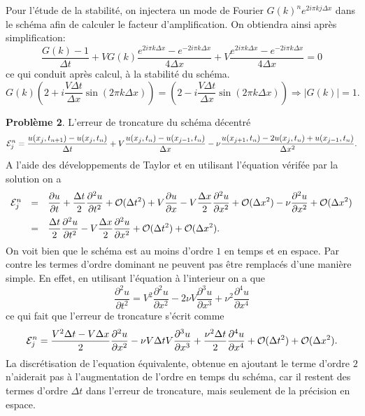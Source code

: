 \documentclass[12pt,a4paper]{article}
\begin{document}
\begin{enumerate}
\noindent Pour l'\'etude de la stabilit\'e, on injectera un mode de
Fourier $G(k)^ne^{2i\pi kj\Delta x}$ dans le sch\'ema afin de calculer le facteur
d'amplification. On obtiendra ainsi apr\`es simplification:
$$
\frac{G(k)-1}{\Delta t}+VG(k)\frac{e^{2i\pi k\Delta x} -e^{-2i\pi k\Delta x} }{4\Delta x}+V\frac{e^{2i\pi k\Delta x} -e^{-2i\pi k\Delta x} }{4\Delta x}=0
$$
ce qui conduit apr\`es calcul, \`a la stabilit\'e du sch\'ema.
$$
G(k) \left(2 + i\frac{V\Delta t}{\Delta x}\sin(2\pi k\Delta x)\right)=
\left(2 - i\frac{V\Delta t}{\Delta x}\sin(2\pi k\Delta
  x)\right)\Rightarrow |G(k)|=1.
$$
\end{enumerate}
{\bf Probl\`eme 2}. L'erreur de troncature du sch\'ema d\'ecentr\'e
$$
{\cal E}^n_j=\frac{u(x_{j},t_{n+1})-u(x_j,t_n)}{\Delta
  t}+V\frac{u(x_{j},t_{n})-u(x_{j-1},t_n)}{\Delta
  x}-\nu\frac{u(x_{j+1},t_n)-2
  u(x_{j},t_n)+u(x_{j-1},t_n)}{\Delta x^2}.
$$
A l'aide des d\'eveloppements de Taylor et en utilisant l'\'equation
v\'erif\'ee par la solution on a
$$
\begin{array}{lcl}
{\cal E}^n_j &=& \displaystyle\frac{\partial u}{\partial t}+\frac{\Delta
  t}{2}\frac{\partial^2 u}{\partial t^2} + {\cal O} (\Delta t^2) + V \frac{\partial u}{\partial x}-V\frac{\Delta
  x}{2}\frac{\partial^2 u}{\partial x^2}+ {\cal O} (\Delta x^2) -\displaystyle \nu \frac{\partial^2
  u}{\partial x^2} +  {\cal O} (\Delta x^2)\\[2ex]
& = & \displaystyle\frac{\Delta
  t}{2}\frac{\partial^2 u}{\partial t^2}  - V\frac{\Delta
  x}{2}\frac{\partial^2 u}{\partial x^2} +  {\cal O} (\Delta t^2) + {\cal O} (\Delta x^2).
\end{array}
$$
On voit bien que le sch\'ema est au moins d'ordre $1$ en temps et en
espace. Par contre les termes d'ordre dominant ne peuvent pas \^etre
remplac\'es d'une mani\`ere simple. En effet,  en utilisant l'\'equation \`a l'interieur on a que
$$
\frac{\partial^2 u}{\partial t^2}=V^2 \frac{\partial^2 u}{\partial x^2}-2\nu V \frac{\partial^3
  u}{\partial x^3}+\nu^2 \frac{\partial^4 u}{\partial x^4}
$$
ce qui fait que l'erreur de troncature s'\'ecrit comme
$$
{\cal E}^n_j = \frac{V^2\Delta t-V\Delta x}{2}\frac{\partial^2
  u}{\partial x^2}-\nu V\Delta t V \frac{\partial^3
  u}{\partial x^3}+\frac{\nu^2\Delta t}{2}\frac{\partial^4 u}{\partial x^4}+{\cal O} (\Delta t^2) + {\cal O} (\Delta x^2).
$$
La discr\'etisation de l'equation \'equivalente, obtenue en ajoutant le terme
d'ordre $2$ n'aiderait pas \`a l'augmentation de l'ordre en temps du sch\'ema,
car il restent des termes d'ordre $\Delta t$ dans l'erreur de
troncature, mais seulement de la pr\'ecision en espace.
\end{document}
